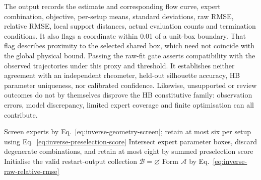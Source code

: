 The output records the estimate and corresponding flow curve, expert
combination, objective, per-setup means, standard deviations, raw RMSE,
relative RMSE, local support distances, actual evaluation counts and
termination conditions. It also flags a coordinate within 0.01 of a
unit-box boundary. That flag describes proximity to the selected shared
box, which need not coincide with the global physical bound.
Passing the raw-fit gate asserts compatibility with the observed
trajectories under this proxy and threshold. It establishes neither
agreement with an independent rheometer, held-out silhouette accuracy,
HB parameter uniqueness, nor calibrated confidence. Likewise,
unsupported or review outcomes do not by themselves disprove the HB
constitutive family: observation errors, model discrepancy, limited
expert coverage and finite optimisation can all contribute.

\begin{algorithm}[!htbp]
\caption{Supported surrogate inverse with numerical search and raw-fit reporting.}
\label{alg:invert}
Screen experts by Eq.~\eqref{eq:inverse-geometry-screen}; retain at most
six per setup using Eq.~\eqref{eq:inverse-preselection-score}\;
Intersect expert parameter boxes, discard degenerate combinations, and
retain at most eight by summed preselection score\;
Initialise the valid restart-output collection $\mathcal B=\varnothing$\;
Form $\mathcal A$ by Eq.~\eqref{eq:inverse-raw-relative-rmse}\;
\end{algorithm}

